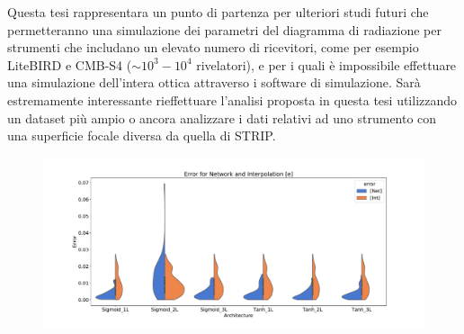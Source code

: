\documentclass[12pt,a4paper,final]{report}			%
\begin{document}
Questa tesi rappresentara un punto di partenza per ulteriori studi futuri che permetteranno una simulazione dei parametri del diagramma di radiazione per strumenti che includano un elevato numero di ricevitori, come per esempio LiteBIRD e CMB-S4 ($\sim10^3-10^4$ rivelatori), e per i quali è impossibile effettuare una simulazione dell'intera ottica attraverso i software di simulazione.
Sarà estremamente interessante rieffettuare l'analisi proposta in questa tesi utilizzando un dataset più ampio o ancora analizzare i dati relativi ad uno strumento con una superficie focale diversa da quella di STRIP.

\vspace{1cm}
\begin{figure}[!ht]
    \centering
    \includegraphics[width=\linewidth]{../figures/violin_plot_e.pdf}
\end{figure}
\end{document}
